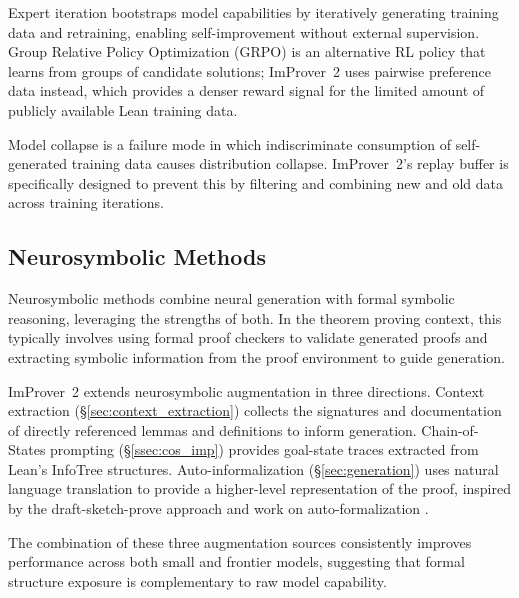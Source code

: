 Expert iteration \cite{ExpertIteration} bootstraps model capabilities by iteratively generating training data and retraining, enabling self-improvement without external supervision. Group Relative Policy Optimization (GRPO) \cite{GRPO} is an alternative RL policy that learns from groups of candidate solutions; ImProver~2 uses pairwise preference data instead, which provides a denser reward signal for the limited amount of publicly available Lean training data.

Model collapse \cite{modelCollapse} is a failure mode in which indiscriminate consumption of self-generated training data causes distribution collapse. ImProver~2's replay buffer is specifically designed to prevent this by filtering and combining new and old data across training iterations.

\subsection{Neurosymbolic Methods}
\label{sec:rw_neurosymbolic}

Neurosymbolic methods combine neural generation with formal symbolic reasoning, leveraging the strengths of both. In the theorem proving context, this typically involves using formal proof checkers to validate generated proofs and extracting symbolic information from the proof environment to guide generation.

ImProver~2 extends neurosymbolic augmentation in three directions. Context extraction (\S\ref{sec:context_extraction}) collects the signatures and documentation of directly referenced lemmas and definitions to inform generation. Chain-of-States prompting (\S\ref{ssec:cos_imp}) provides goal-state traces extracted from Lean's InfoTree structures. Auto-informalization (\S\ref{sec:generation}) uses natural language translation to provide a higher-level representation of the proof, inspired by the draft-sketch-prove approach \cite{DraftSketchProve} and work on auto-formalization \cite{autoinformalization}.

The combination of these three augmentation sources consistently improves performance across both small and frontier models, suggesting that formal structure exposure is complementary to raw model capability.
